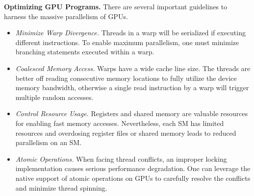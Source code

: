 \vspace{1mm}\noindent\textbf{Optimizing GPU Programs.}
There are several important guidelines to harness the massive parallelism of GPUs.
\begin{itemize}
	\item \emph{Minimize Warp Divergence.} Threads in a warp will be serialized if executing different instructions. To enable maximum parallelism, one must minimize branching statements executed within a warp.  
	\item \emph{Coalesced Memory Access.} Warps have a wide cache line size. The threads are better off reading consecutive memory locations to fully utilize the device memory bandwidth, otherwise a single read instruction by a warp will trigger multiple random accesses. 
	\item \emph{Control Resource Usage.} Registers and shared memory are valuable resources for enabling fast memory accesses. Nevertheless, each SM has limited resources and overdosing register files or shared memory leads to reduced parallelism on an SM.  
	\item \emph{Atomic Operations.} When facing thread conflicts, an improper locking implementation causes serious performance degradation. One can leverage the native support of atomic operations \cite{sanders2010cuda} on GPUs to carefully resolve the conflicts and minimize thread spinning.
\end{itemize}